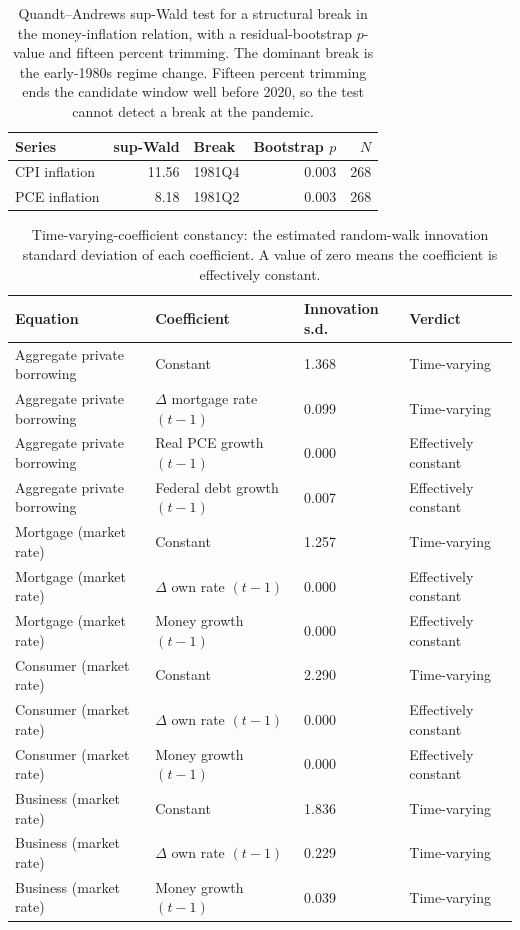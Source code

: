 \begin{table}[htbp]
\centering
\setlength{\belowcaptionskip}{8pt}
\small

\caption{Quandt--Andrews sup-Wald test for a structural break in the money-inflation relation, with a residual-bootstrap $p$-value and fifteen percent trimming. The dominant break is the early-1980s regime change. Fifteen percent trimming ends the candidate window well before 2020, so the test cannot detect a break at the pandemic.}
\label{tab:break}
\begin{tabular}{lrlrr}
\toprule
Series & sup-Wald & Break & Bootstrap $p$ & $N$ \\
\midrule
CPI inflation & 11.56 & 1981Q4 & 0.003 & 268 \\
PCE inflation & 8.18 & 1981Q2 & 0.003 & 268 \\
\bottomrule
\end{tabular}
\end{table}

\begin{table}[htbp]
\centering
\setlength{\belowcaptionskip}{8pt}
\footnotesize
\setlength{\tabcolsep}{4pt}
\caption{Time-varying-coefficient constancy: the estimated random-walk innovation standard deviation of each coefficient. A value of zero means the coefficient is effectively constant.}
\label{tab:constancy}
\begin{tabular}{llll}
\toprule
Equation & Coefficient & Innovation s.d. & Verdict \\
\midrule
Aggregate private borrowing & Constant & 1.368 & Time-varying \\
Aggregate private borrowing & $\Delta$ mortgage rate $(t{-}1)$ & 0.099 & Time-varying \\
Aggregate private borrowing & Real PCE growth $(t{-}1)$ & 0.000 & Effectively constant \\
Aggregate private borrowing & Federal debt growth $(t{-}1)$ & 0.007 & Effectively constant \\
Mortgage (market rate) & Constant & 1.257 & Time-varying \\
Mortgage (market rate) & $\Delta$ own rate $(t{-}1)$ & 0.000 & Effectively constant \\
Mortgage (market rate) & Money growth $(t{-}1)$ & 0.000 & Effectively constant \\
Consumer (market rate) & Constant & 2.290 & Time-varying \\
Consumer (market rate) & $\Delta$ own rate $(t{-}1)$ & 0.000 & Effectively constant \\
Consumer (market rate) & Money growth $(t{-}1)$ & 0.000 & Effectively constant \\
Business (market rate) & Constant & 1.836 & Time-varying \\
Business (market rate) & $\Delta$ own rate $(t{-}1)$ & 0.229 & Time-varying \\
Business (market rate) & Money growth $(t{-}1)$ & 0.039 & Time-varying \\
\bottomrule
\end{tabular}
\end{table}

